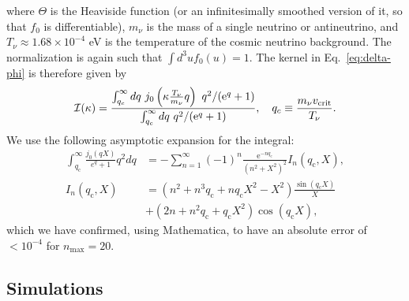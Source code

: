 \documentclass[useAMS, usenatbib]{mnras}
\newcommand{\barr}{\begin{eqnarray}}
\newcommand{\earr}{\end{eqnarray}}
\newcommand{\rme}{\textrm{e}}
\begin{document}
where $\Theta$ is the Heaviside function (or an infinitesimally smoothed version of it, so that $f_0$ is differentiable), $m_\nu$ is the mass of a single neutrino or antineutrino, and $T_\nu \approx 1.68 \times 10^{-4}$ eV is the temperature of the cosmic neutrino background. The normalization is again such that $\int d^3 u f_0(u) = 1$. The kernel in Eq.~\eqref{eq:delta-phi} is therefore given by
\barr
\mathcal{I}(\kappa) = \frac{\int_{q_c}^{\infty} dq~ j_0\left(\kappa \frac{T_\nu}{m_\nu}q\right)~ q^2 /(\rme^q + 1) }{\int_{q_c}^{\infty} dq ~q^2/(\rme^q + 1)}, \ \ \ q_c \equiv \frac{m_\nu v_{\rm crit}}{T_\nu}.
\earr
We use the following asymptotic expansion for the integral:
\begin{align}
 \int^\infty_{q_\mathrm{c}} \frac{j_0(qX)}{e^q + 1} q^2 dq &= - \sum^{\infty}_{n=1} (-1)^n \frac{\rme^{-n q_\mathrm{c}}}{(n^2+X^2)^2} I_n(q_\mathrm{c},X),\\
 I_n(q_\mathrm{c},X) &= \left(n^2 + n^3 q_\mathrm{c} + n q_\mathrm{c} X^2 - X^2\right) \frac{\sin(q_\mathrm{c} X)}{X} \nonumber \\
 &+ \left(2n + n^2 q_\mathrm{c} + q_\mathrm{c} X^2\right) \cos(q_\mathrm{c} X),
\end{align}
which we have confirmed, using Mathematica, to have an absolute error of $< 10^{-4}$ for $n_\mathrm{max} = 20$.

\subsection{Simulations}
\label{sec:simulations}
\end{document}
